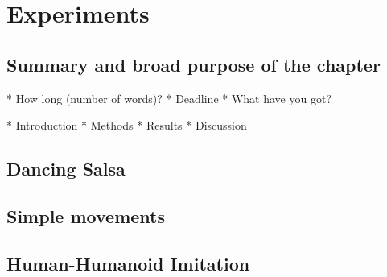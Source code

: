 
\chapter{Experiments}

\ifpdf
    \graphicspath{{chapter4/figs/raster/}{chapter4/figs/PDF/}{chapter4/figs/}}
\else
    \graphicspath{{chapter4/figs/vector/}{chapter4/figs/}}
\fi

\section*{Summary and broad purpose of the chapter}
* How long (number of words)?
* Deadline
* What have you got?

* Introduction
* Methods
* Results
* Discussion


\section{Dancing Salsa}
\lipsum[1-4]

\section{Simple movements}
\section{Human-Humanoid Imitation}
